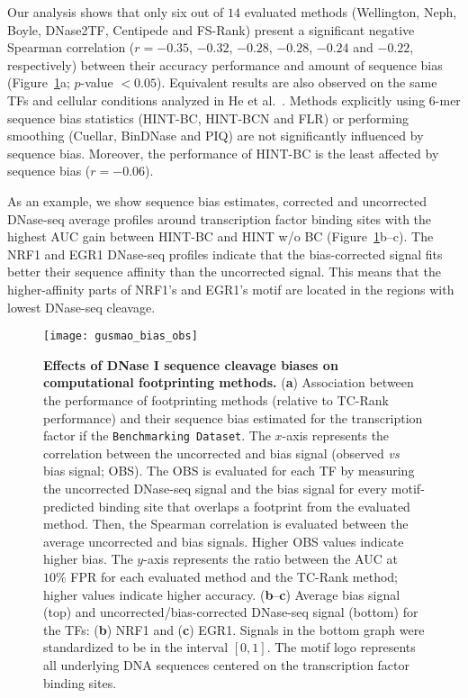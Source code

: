 Our analysis shows that only six out of $14$ evaluated methods (Wellington, Neph, Boyle, DNase2TF, Centipede and FS-Rank) present a significant negative Spearman correlation ($r = -0.35$, $-0.32$, $-0.28$, $-0.28$, $-0.24$ and $-0.22$, respectively) between their accuracy performance and amount of sequence bias (Figure~\ref{fig:gusmao_bias_obs}a; $p$-value $< 0.05$). Equivalent results are also observed on the same TFs and cellular conditions analyzed in He et al.~\cite{he2014}. Methods explicitly using $6$-mer sequence bias statistics (HINT-BC, HINT-BCN and FLR) or performing smoothing (Cuellar, BinDNase and PIQ) are not significantly influenced by sequence bias. Moreover, the performance of HINT-BC is the least affected by sequence bias ($r = -0.06$).

As an example, we show sequence bias estimates, corrected and uncorrected DNase-seq average profiles around transcription factor binding sites with the highest AUC gain between HINT-BC and HINT w/o BC (Figure~\ref{fig:gusmao_bias_obs}b--c). The NRF1 and EGR1 DNase-seq profiles indicate that the bias-corrected signal fits better their sequence affinity than the uncorrected signal. This means that the higher-affinity parts of NRF1's and EGR1's motif are located in the regions with lowest DNase-seq cleavage.

\begin{figure}[h!]
\centering
\texttt{[image: gusmao\_bias\_obs]}
\caption[Effects of DNase I sequence cleavage biases on computational footprinting methods]{\textbf{Effects of DNase I sequence cleavage biases on computational footprinting methods.} (\textbf{a}) Association between the performance of footprinting methods (relative to TC-Rank performance) and their sequence bias estimated for the transcription factor if the {\tt Benchmarking Dataset}. The $x$-axis represents the correlation between the uncorrected and bias signal (observed \emph{vs} bias signal; OBS). The OBS is evaluated for each TF by measuring the uncorrected DNase-seq signal and the bias signal for every motif-predicted binding site that overlaps a footprint from the evaluated method. Then, the Spearman correlation is evaluated between the average uncorrected and bias signals. Higher OBS values indicate higher bias. The $y$-axis represents the ratio between the AUC at $10\%$ FPR for each evaluated method and the TC-Rank method; higher values indicate higher accuracy. (\textbf{b}--\textbf{c}) Average bias signal (top) and uncorrected/bias-corrected DNase-seq signal (bottom) for the TFs: (\textbf{b}) NRF1 and (\textbf{c}) EGR1. Signals in the bottom graph were standardized to be in the interval $[0,1]$. The motif logo represents all underlying DNA sequences centered on the transcription factor binding sites.}
\label{fig:gusmao_bias_obs}
\end{figure}

